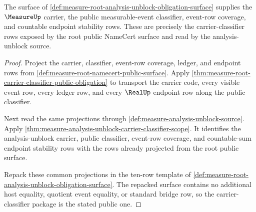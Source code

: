 \begin{theorem}
\label{thm:measure-root-analysis-unblock-carrier-classifier}
The surface of
\autoref{def:measure-root-analysis-unblock-obligation-surface} supplies the
$\MeasureUp$ carrier, the public measurable-event classifier, event-row
coverage, and countable endpoint stability rows. These are precisely the
carrier-classifier rows exposed by the root public NameCert surface and read
by the analysis-unblock source.
\end{theorem}
\begin{proof}
Project the carrier, classifier, event-row coverage, ledger, and endpoint
rows from \autoref{def:measure-root-namecert-public-surface}. Apply
\autoref{thm:measure-root-carrier-classifier-public-obligation} to transport
the carrier code, every visible event row, every ledger row, and every
$\RealUp$ endpoint row along the public classifier.

Next read the same projections through
\autoref{def:measure-analysis-unblock-source}. Apply
\autoref{thm:measure-analysis-unblock-carrier-classifier-scope}. It
identifies the analysis-unblock carrier, public classifier, event-row
coverage, and countable-sum endpoint stability rows with the rows already
projected from the root public surface.

Repack these common projections in the ten-row template of
\autoref{def:measure-root-analysis-unblock-obligation-surface}. The repacked
surface contains no additional host equality, quotient event equality, or
standard bridge row, so the carrier-classifier package is the stated public
one.
\end{proof}

